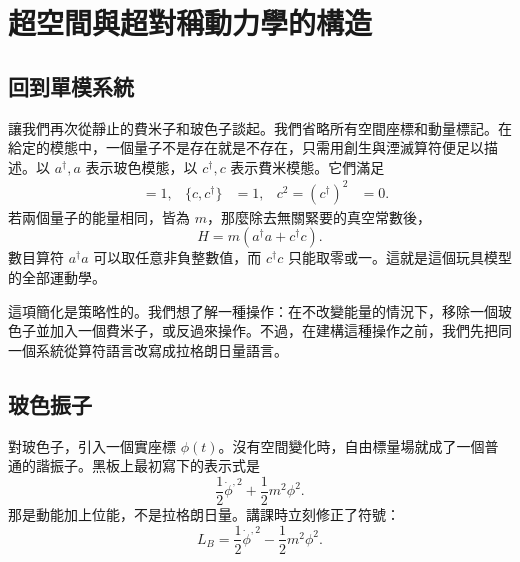 \chapter{超空間與超對稱動力學的構造}


\section{回到單模系統}

讓我們再次從靜止的費米子和玻色子談起。我們省略所有空間座標和動量標記。在給定的模態中，一個量子不是存在就是不存在，只需用創生與湮滅算符便足以描述。以 \(a^\dagger,a\) 表示玻色模態，以 \(c^\dagger,c\) 表示費米模態。它們滿足
\begin{align}
[a,a^\dagger]&=1,
&
\{c,c^\dagger\}&=1,
&
c^2=(c^\dagger)^2&=0.
\end{align}
若兩個量子的能量相同，皆為 \(m\)，那麼除去無關緊要的真空常數後，
\begin{equation}
H=m\left(a^\dagger a+c^\dagger c\right).
\label{eq:l7-one-mode-hamiltonian}
\end{equation}
數目算符 \(a^\dagger a\) 可以取任意非負整數值，而 \(c^\dagger c\) 只能取零或一。這就是這個玩具模型的全部運動學。

這項簡化是策略性的。我們想了解一種操作：在不改變能量的情況下，移除一個玻色子並加入一個費米子，或反過來操作。不過，在建構這種操作之前，我們先把同一個系統從算符語言改寫成拉格朗日量語言。

\section{玻色振子}

對玻色子，引入一個實座標 \(\phi(t)\)。沒有空間變化時，自由標量場就成了一個普通的諧振子。黑板上最初寫下的表示式是
\[
\frac{1}{2}\dot\phi^{,2}+\frac{1}{2}m^2\phi^2.
\]
那是動能加上位能，不是拉格朗日量。講課時立刻修正了符號：
\begin{equation}
L_B=\frac{1}{2}\dot\phi^{,2}-\frac{1}{2}m^2\phi^2.
\label{eq:l7-boson-lagrangian}
\end{equation}

